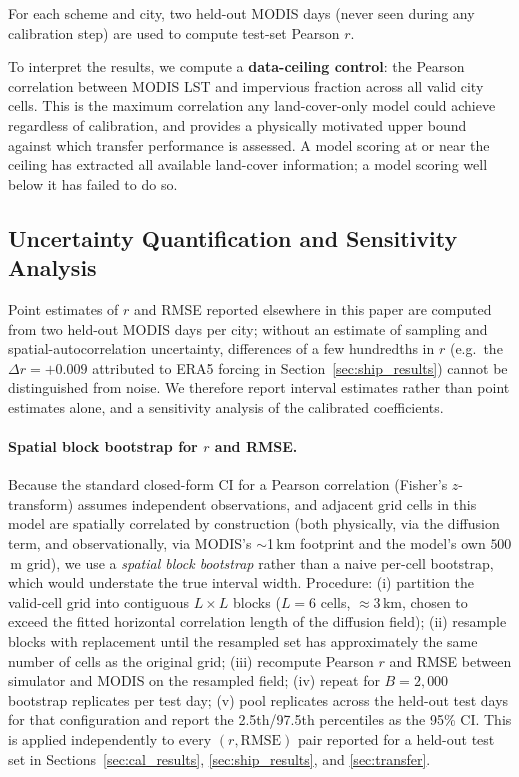 \documentclass[12pt, letterpaper]{article}
\begin{document}
For each scheme and city, two held-out MODIS days (never seen during any
calibration step) are used to compute test-set Pearson $r$.

To interpret the results, we compute a \textbf{data-ceiling control}:
the Pearson correlation between MODIS LST and impervious fraction across
all valid city cells. This is the maximum correlation any land-cover-only
model could achieve regardless of calibration, and provides a physically
motivated upper bound against which transfer performance is assessed.
A model scoring at or near the ceiling has extracted all available
land-cover information; a model scoring well below it has failed to do so.

\subsection{Uncertainty Quantification and Sensitivity Analysis}
\label{sec:uncertainty_methods}

Point estimates of $r$ and RMSE reported elsewhere in this paper are
computed from two held-out MODIS days per city; without an estimate of
sampling and spatial-autocorrelation uncertainty, differences of a few
hundredths in $r$ (e.g.\ the $\Delta r = +0.009$ attributed to ERA5 forcing
in Section~\ref{sec:ship_results}) cannot be distinguished from noise. We
therefore report interval estimates rather than point estimates alone, and
a sensitivity analysis of the calibrated coefficients.

\paragraph{Spatial block bootstrap for $r$ and RMSE.}
Because the standard closed-form CI for a Pearson correlation (Fisher's
$z$-transform) assumes independent observations, and adjacent grid cells
in this model are spatially correlated by construction (both physically,
via the diffusion term, and observationally, via MODIS's $\sim$1\,km
footprint and the model's own $500$\,m grid), we use a \emph{spatial block
bootstrap} rather than a naive per-cell bootstrap, which would understate
the true interval width. Procedure: (i) partition the valid-cell grid into
contiguous $L \times L$ blocks ($L = 6$ cells, $\approx 3$\,km, chosen to
exceed the fitted horizontal correlation length of the diffusion field);
(ii) resample blocks with replacement until the resampled set has
approximately the same number of cells as the original grid; (iii) recompute
Pearson $r$ and RMSE between simulator and MODIS on the resampled field;
(iv) repeat for $B = 2{,}000$ bootstrap replicates per test day; (v) pool
replicates across the held-out test days for that configuration and report
the 2.5th/97.5th percentiles as the 95\% CI. This is applied independently
to every $(r, \mathrm{RMSE})$ pair reported for a held-out test set in
Sections~\ref{sec:cal_results}, \ref{sec:ship_results}, and
\ref{sec:transfer}.
\end{document}
